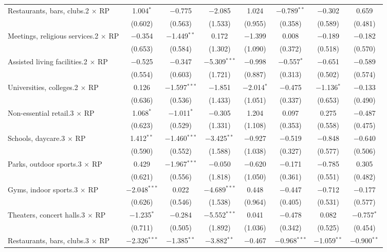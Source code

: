 \begin{table}[!htbp]
\begin{tabular}{@{\extracolsep{5pt}}lccccccc}
  Restaurants, bars, clubs.2 $\times$ RP & 1.004$^{*}$ & $-$0.775 & $-$2.085 & 1.024 & $-$0.789$^{**}$ & $-$0.302 & 0.659 \\ 
  & (0.602) & (0.563) & (1.533) & (0.955) & (0.358) & (0.589) & (0.481) \\ 
  Meetings, religious services.2 $\times$ RP & $-$0.354 & $-$1.449$^{**}$ & 0.172 & $-$1.399 & 0.008 & $-$0.189 & $-$0.182 \\ 
  & (0.653) & (0.584) & (1.302) & (1.090) & (0.372) & (0.518) & (0.570) \\ 
  Assisted living facilities.2 $\times$ RP & $-$0.525 & $-$0.347 & $-$5.309$^{***}$ & $-$0.998 & $-$0.557$^{*}$ & $-$0.651 & $-$0.589 \\ 
  & (0.554) & (0.603) & (1.721) & (0.887) & (0.313) & (0.502) & (0.574) \\ 
  Universities, colleges.2 $\times$ RP & 0.126 & $-$1.597$^{***}$ & $-$1.851 & $-$2.014$^{*}$ & $-$0.475 & $-$1.136$^{*}$ & $-$0.133 \\ 
  & (0.636) & (0.536) & (1.433) & (1.051) & (0.337) & (0.653) & (0.490) \\ 
  Non-essential retail.3 $\times$ RP & 1.068$^{*}$ & $-$1.011$^{*}$ & $-$0.305 & 1.204 & 0.097 & 0.275 & $-$0.487 \\ 
  & (0.623) & (0.529) & (1.331) & (1.108) & (0.353) & (0.558) & (0.475) \\ 
  Schools, daycare.3 $\times$ RP & 1.412$^{**}$ & $-$1.460$^{***}$ & $-$3.425$^{**}$ & $-$0.927 & $-$0.519 & $-$0.848 & $-$0.640 \\ 
  & (0.590) & (0.552) & (1.588) & (1.038) & (0.327) & (0.577) & (0.506) \\ 
  Parks, outdoor sports.3 $\times$ RP & 0.429 & $-$1.967$^{***}$ & $-$0.050 & $-$0.620 & $-$0.171 & $-$0.785 & 0.305 \\ 
  & (0.621) & (0.556) & (1.818) & (1.050) & (0.361) & (0.551) & (0.482) \\ 
  Gyms, indoor sports.3 $\times$ RP & $-$2.048$^{***}$ & 0.022 & $-$4.689$^{***}$ & 0.448 & $-$0.447 & $-$0.712 & $-$0.177 \\ 
  & (0.626) & (0.546) & (1.538) & (0.964) & (0.405) & (0.531) & (0.577) \\ 
  Theaters, concert halls.3 $\times$ RP & $-$1.235$^{*}$ & $-$0.284 & $-$5.552$^{***}$ & 0.041 & $-$0.478 & 0.082 & $-$0.757$^{*}$ \\ 
  & (0.711) & (0.505) & (1.892) & (1.036) & (0.342) & (0.525) & (0.454) \\ 
  Restaurants, bars, clubs.3 $\times$ RP & $-$2.326$^{***}$ & $-$1.385$^{**}$ & $-$3.882$^{**}$ & $-$0.467 & $-$0.968$^{***}$ & $-$1.059$^{**}$ & $-$0.900$^{**}$ \\ 

\end{tabular}
\end{table}
